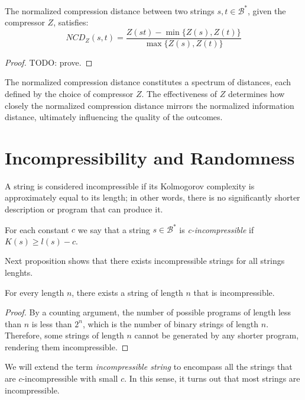 \begin{proposition}
The normalized compression distance between two strings $s,  t \in \mathcal{B}^{\ast}$, given the compressor $Z$, satisfies:
\[
NCD_Z(s, t) = \frac{ Z(st) - \min\{ Z(s), Z(t) \}}{\max \{ Z(s), Z(t) \} }
\]
\end{proposition}
\begin{proof}
{\color{red} TODO: prove.}
\end{proof}

The normalized compression distance constitutes a spectrum of distances, each defined by the choice of compressor $Z$. The effectiveness of $Z$ determines how closely the normalized compression distance mirrors the normalized information distance, ultimately influencing the quality of the outcomes.


%
%

\section{Incompressibility and Randomness}
\label{sec:incompressibility_randomness}

A string is considered incompressible if its Kolmogorov complexity is approximately equal to its length; in other words, there is no significantly shorter description or program that can produce it.

\begin{definition}
For each constant $c$ we say that a string $s \in \mathcal{B}^{\ast}$ is \emph{c-incompressible} if $K(s) \geq l(s) - c$.
\end{definition}

Next proposition shows that there exists incompressible strings for all strings lenghts.

\begin{proposition}
For every length $n$, there exists a string of length $n$ that is incompressible.
\end{proposition}
\begin{proof}
By a counting argument, the number of possible programs of length less than $n$ is less than $2^n$, which is the number of binary strings of length $n$. Therefore, some strings of length $n$ cannot be generated by any shorter program, rendering them incompressible.
\end{proof}

We will extend the term \emph{incompressible string} to encompass all the strings that are $c$-incompressible with small $c$. In this sense, it turns out that most strings are incompressible.

